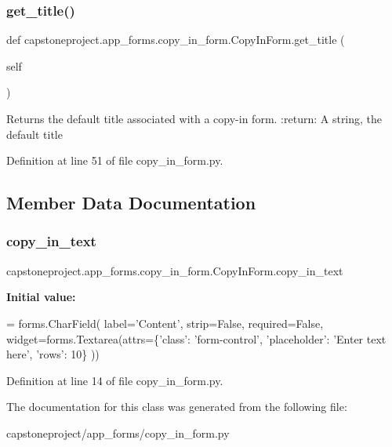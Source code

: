 \subsubsection{\texorpdfstring{get\+\_\+title()}{get\_title()}}
{\footnotesize\ttfamily def capstoneproject.\+app\+\_\+forms.\+copy\+\_\+in\+\_\+form.\+Copy\+In\+Form.\+get\+\_\+title (\begin{DoxyParamCaption}\item[{}]{self }\end{DoxyParamCaption})}

\begin{DoxyVerb}Returns the default title associated with a copy-in form.
:return: A string, the default title
\end{DoxyVerb}
 

Definition at line 51 of file copy\+\_\+in\+\_\+form.\+py.



\subsection{Member Data Documentation}
\mbox{\label{classcapstoneproject_1_1app__forms_1_1copy__in__form_1_1_copy_in_form_a931f23bbf45e5e655738d07a4a0a6f6c}} 
\subsubsection{\texorpdfstring{copy\+\_\+in\+\_\+text}{copy\_in\_text}}
{\footnotesize\ttfamily capstoneproject.\+app\+\_\+forms.\+copy\+\_\+in\+\_\+form.\+Copy\+In\+Form.\+copy\+\_\+in\+\_\+text\hspace{0.3cm}{\ttfamily [static]}}

{\bfseries Initial value\+:}
\begin{DoxyCode}
=  forms.CharField(
        label=\textcolor{stringliteral}{'Content'},
        strip=\textcolor{keyword}{False},
        required=\textcolor{keyword}{False},
        widget=forms.Textarea(attrs=\{\textcolor{stringliteral}{'class'}: \textcolor{stringliteral}{'form-control'}, \textcolor{stringliteral}{'placeholder'}: \textcolor{stringliteral}{'Enter text here'}, \textcolor{stringliteral}{'rows'}: 10\}
      ))
\end{DoxyCode}


Definition at line 14 of file copy\+\_\+in\+\_\+form.\+py.



The documentation for this class was generated from the following file\+:\begin{DoxyCompactItemize}
\item 
capstoneproject/app\+\_\+forms/copy\+\_\+in\+\_\+form.\+py\end{DoxyCompactItemize}
